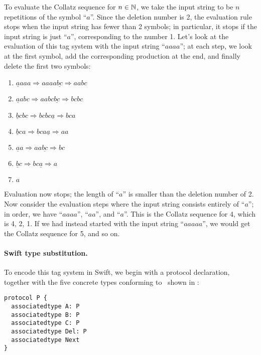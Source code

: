 \documentclass[../generics]{subfiles}
\begin{document}
To evaluate the Collatz sequence for $n\in\mathbb{N}$, we take the input string to be $n$ repetitions of the symbol ``$a$''. Since the deletion number is 2, the evaluation rule stops when the input string has fewer than 2 symbols; in particular, it stops if the input string is just ``$a$'', corresponding to the number 1. Let's look at the evaluation of this tag system with the input string ``$aaaa$''; at each step, we look at the first symbol, add the corresponding production at the end, and finally delete the first two symbols:
\begin{enumerate}
\item $\underline{a}aaa \Rightarrow aaaa\underline{bc} \Rightarrow aabc$
\item $\underline{a}abc \Rightarrow aabc\underline{bc} \Rightarrow bcbc$
\item $\underline{b}cbc \Rightarrow bcbc\underline{a} \Rightarrow bca$
\item $\underline{b}ca \Rightarrow bca\underline{a} \Rightarrow aa$
\item $\underline{a}a \Rightarrow aa\underline{bc} \Rightarrow bc$
\item $\underline{b}c \Rightarrow bc\underline{a} \Rightarrow a$
\item $a$
\end{enumerate}
Evaluation now stops; the length of ``$a$'' is smaller than the deletion number of 2. Now consider the evaluation steps where the input string consists entirely of ``$a$''; in order, we have ``$aaaa$'', ``$aa$'', and ``$a$''. This is the Collatz sequence for 4, which is 4, 2, 1. If we had instead started with the input string ``$aaaaa$'', we would get the Collatz sequence for 5, and so on.

\paragraph{Swift type substitution.}
To encode this tag system in Swift, we begin with a protocol declaration, together with the five concrete types conforming to \tP\ shown in :
\begin{Verbatim}
protocol P {
  associatedtype A: P
  associatedtype B: P
  associatedtype C: P
  associatedtype Del: P
  associatedtype Next
}
\end{Verbatim}
\end{document}
